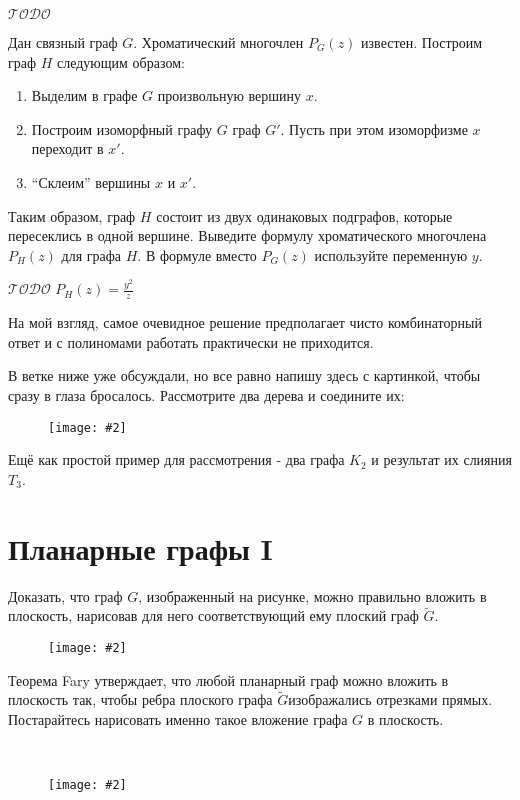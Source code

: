 \documentclass[a4paper,12pt]{article}
\numberwithin{figure}{section}
\def\TODO{\guillemotleft$\mathcal{TODO}$\guillemotright\textellipsis}
\def\Gwave{$\tilde{G}$}
\newcommand\CenterFigure[2]{\begin{figure}[H]\centering\texttt{[image: \#2]}\end{figure}}
\begin{document}
\begin{problem}

	\TODO

	Дан связный граф $G$. Хроматический многочлен $P_G(z)$ известен. Построим граф $H$ следующим образом:
	\begin{enumerate}
		\item Выделим в графе $G$ произвольную вершину $x$.
		\item Построим изоморфный графу $G$ граф $G'$. Пусть при этом изоморфизме $x$ переходит в $x'$.
		\item ``Склеим'' вершины $x$ и $x'$.
	\end{enumerate}
	Таким образом, граф $H$ состоит из двух одинаковых подграфов, которые пересеклись в одной вершине. Выведите формулу хроматического многочлена $P_H(z)$ для графа $H$. В формуле вместо $P_G(z)$ используйте переменную $y$.
\end{problem}
\begin{solution}
	\TODO
	$\displaystyle P_H(z)=\frac{y^2}{z}$
	
	На мой взгляд, самое очевидное решение предполагает чисто комбинаторный ответ и с полиномами работать  практически не приходится.
	
	В ветке ниже уже обсуждали, но все равно напишу здесь с картинкой, чтобы сразу в глаза бросалось. Рассмотрите два дерева и соедините их:
		\CenterFigure{6cm}{chromatic-number-after-merge.png}
	Ещё как простой пример для рассмотрения - два графа $K_2$ и результат их слияния $T_3$.
\end{solution}



\section{Планарные графы I}


\begin{problem}
	Доказать, что граф $G$, изображенный на рисунке, можно правильно вложить в плоскость, нарисовав для него соответствующий ему плоский граф \Gwave.
	\CenterFigure{7cm}{planar1-step3-problem.png}
	Теорема Fary утверждает, что любой планарный граф можно вложить в плоскость так, чтобы ребра плоского графа \Gwave изображались отрезками прямых. Постарайтесь нарисовать именно такое вложение графа $G$ в плоскость. 
\end{problem}
\begin{solution}
	\ \\
	\CenterFigure{11cm}{planar1-step3-solution.png}
\end{solution}
\end{document}
